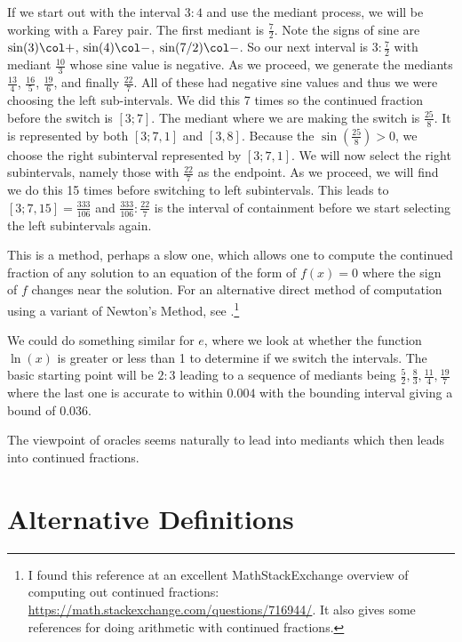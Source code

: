 \documentclass[12pt]{article}
\begin{document}
If we start out with the interval  $3:4$ and use the mediant process, we will be working with a Farey pair. The first mediant is $\frac{7}{2}$. Note the signs of sine are  $\sin(3) \col +$, $\sin(4) \col -$, $\sin(7/2) \col -$. So our next interval is $3:\frac{7}{2}$ with mediant $\frac{10}{3}$ whose sine value is negative. As we proceed, we generate the mediants $\frac{13}{4}$, $\frac{16}{5}$, $\frac{19}{6}$, and finally $\frac{22}{7}$. All of these had negative sine values and thus we were choosing the left sub-intervals. We did this 7 times so the continued fraction before the switch is $[3;7]$. The mediant where we are making the switch is $\frac{25}{8}$. It is represented by both $[3; 7, 1]$ and $[3, 8]$.  Because the $\sin(\frac{25}{8}) > 0$, we choose the right subinterval represented by $[3; 7, 1]$. We will now select the right subintervals, namely those with $\frac{22}{7}$ as the endpoint. As we proceed, we will find we do this 15 times before switching to left subintervals. This leads to $[3; 7, 15] = \frac{333}{106}$ and $\frac{333}{106}:\frac{22}{7}$ is the interval of containment before we start selecting the left subintervals again.

This is a method, perhaps a slow one, which allows one to compute the continued fraction of any solution to an equation of the form of $f(x) =0$ where the sign of $f$ changes near the solution. For an alternative direct method of computation using a variant of Newton's Method, see \cite{shiu95}.\footnote{I found this reference at an excellent MathStackExchange overview of computing out continued fractions: \url{https://math.stackexchange.com/questions/716944/}.  It also gives some references for doing arithmetic with continued fractions.} 

We could do something similar for $e$, where we look at whether the function $\ln(x)$ is greater or less than 1 to determine if we switch the intervals. The basic starting point will be $2:3$ leading to a sequence of mediants being $\frac{5}{2}, \frac{8}{3}, \frac{11}{4}, \frac{19}{7}$ where the last one is accurate to within $0.004$ with the bounding interval giving a bound of $0.036$. 

The viewpoint of oracles seems naturally to lead into mediants which then leads into continued fractions. 


\section{Alternative Definitions}\label{sec:others}
\end{document}
